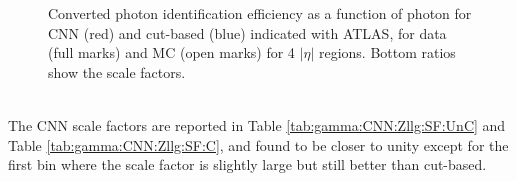 \begin{figure}[htbp]
	\begin{tcolorbox}[colback=black!5!white,colframe=white!75!black]
    \caption{Converted photon identification efficiency as a function of photon \eT for CNN (red) and cut-based (blue) indicated with ATLAS, for data (full marks) and MC (open marks) for 4 $|\eta|$ regions. Bottom ratios show the scale factors.}
    \label{fig:gamma:CNN:Zllg:Energy:C}
    \end{tcolorbox}
\end{figure}
\\
The CNN scale factors are reported in Table \ref{tab:gamma:CNN:Zllg:SF:UnC} and Table \ref{tab:gamma:CNN:Zllg:SF:C}, and found to be closer to unity except for the first \eT bin where the scale factor is slightly large but still better than cut-based. 
